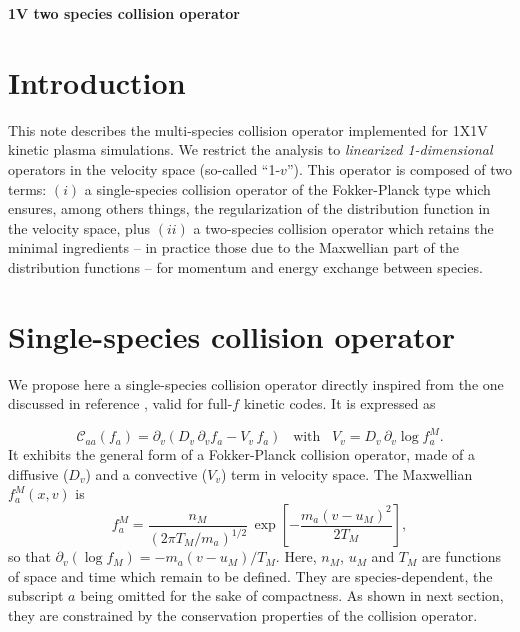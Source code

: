 \documentclass[11pt]{article}
\begin{document}
\begin{center}
    \LARGE \textbf{1V two species collision operator} \\
    \vspace{0.8cm} 
\end{center}
\section{Introduction}
This note describes the multi-species collision operator implemented for 1X1V kinetic plasma simulations. We restrict the analysis to \emph{linearized 1-dimensional} operators in the velocity space (so-called ``1-$v$''). This operator is composed of two terms: $(i)$ a single-species collision operator of the Fokker-Planck type which ensures, among others things, the regularization of the distribution function in the velocity space, plus $(ii)$ a two-species collision operator which retains the minimal ingredients -- in practice those due to the Maxwellian part of the distribution functions -- for momentum and energy exchange between species.

\section{Single-species collision operator}


We propose here a single-species collision operator directly inspired from the one discussed in reference \cite{DifPradalier2011}, valid for full-$f$ kinetic codes. It is expressed as

%
\begin{equation} \label{eq:CollOp_1}
\mathcal{C}_{aa}(f_a) = \partial_{v} \left( 
D_v\, \partial_{v}f_{a} - V_v\,  f_a\right)
\;\;\; \textrm{with} \;\;\;
V_v = D_v\, \partial_{v} \operatorname{log} f^M_{a} .
\end{equation}
%
It exhibits the general form of a Fokker-Planck collision operator, made of a diffusive ($D_v$) and a convective ($V_v$) term in velocity space.
The Maxwellian $f_a^{M}(x,v)$ is
%
\begin{equation} \label{eq:f_M}
f_a^{M} = \frac{n_{M}}{(2\pi T_{M}/m_a)^{1/2}}\, \exp\left[ -\frac{m_a(v-u_{M})^2}{2T_{M}}\right],
\end{equation}
%
so that $\partial_v(\log f_{M}) = -m_a(v-u_{M})/T_{M}$. Here, $n_{M}$, $u_{M}$ and $T_{M}$ are functions of space and time which remain to be defined. They are species-dependent, the subscript $a$ being omitted for the sake of compactness. As shown in next section, they are constrained by the conservation properties of the collision operator.
\end{document}
